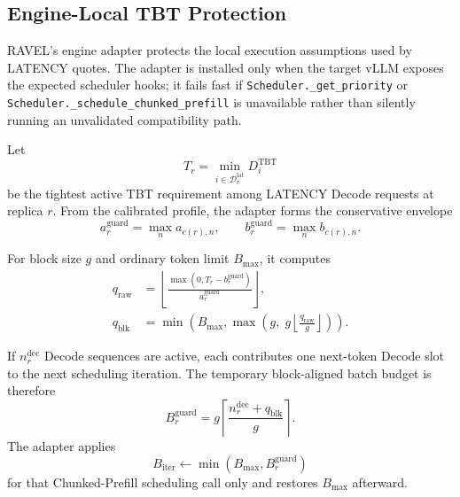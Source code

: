 \documentclass[letterpaper,twocolumn,10pt]{article}
\begin{document}
\subsection{Engine-Local TBT Protection}
\label{sec:appendix:tbt-control}

RAVEL's engine adapter protects the local execution assumptions used by
LATENCY quotes.
The adapter is installed only when the target vLLM exposes the expected
scheduler hooks; it fails fast if
\texttt{Scheduler.\_get\_priority} or
\texttt{Scheduler.\_schedule\_chunked\_prefill} is unavailable rather than
silently running an unvalidated compatibility path.

Let
\begin{equation}
    T_r
    =
    \min_{i\in\mathcal{D}^{\mathrm{lat}}_r}
       D_i^{\mathrm{TBT}}
    \label{eq:appendix:tightest-tbt}
\end{equation}
be the tightest active TBT requirement among LATENCY Decode requests at
replica $r$.
From the calibrated profile, the adapter forms the conservative envelope
\begin{equation}
    a^{\mathrm{guard}}_r=\max_n a_{c(r),n},
    \qquad
    b^{\mathrm{guard}}_r=\max_n b_{c(r),n}.
    \label{eq:appendix:prefill-guard-envelope}
\end{equation}

For block size $g$ and ordinary token limit $B_{\max}$, it computes
\begin{align}
    q_{\mathrm{raw}}
    &=
      \left\lfloor
         \frac{\max(0,T_r-b^{\mathrm{guard}}_r)}
              {a^{\mathrm{guard}}_r}
      \right\rfloor,
      \label{eq:appendix:chunk-raw}\\
    q_{\mathrm{blk}}
    &=
      \min\!\left(
        B_{\max},
        \max\!\left(
          g,\;
          g\left\lfloor\frac{q_{\mathrm{raw}}}{g}\right\rfloor
        \right)
      \right).
      \label{eq:appendix:chunk-aligned}
\end{align}

If $n_r^{\mathrm{dec}}$ Decode sequences are active, each contributes one
next-token Decode slot to the next scheduling iteration.
The temporary block-aligned batch budget is therefore
\begin{equation}
    B^{\mathrm{guard}}_r
    =
    g
    \left\lceil
       \frac{n_r^{\mathrm{dec}}+q_{\mathrm{blk}}}{g}
    \right\rceil .
    \label{eq:appendix:guard-batch-budget}
\end{equation}
The adapter applies
\begin{equation}
    B_{\mathrm{iter}}
    \leftarrow
    \min(B_{\max},B^{\mathrm{guard}}_r)
    \label{eq:appendix:temporary-batch-cap}
\end{equation}
for that Chunked-Prefill scheduling call only and restores $B_{\max}$
afterward.
\end{document}

